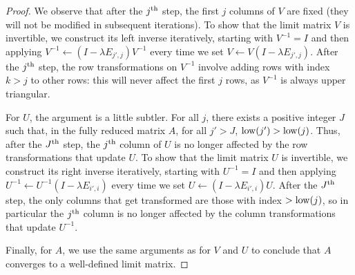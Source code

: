 \begin{proof}
  We observe that after the $j^{\text{th}}$ step, the first $j$ columns of $V$ are fixed (they will not be modified in subsequent iterations). To show that the limit matrix $V$ is invertible, we construct its left inverse iteratively, starting with $V^{-1} = I$ and then applying $V^{-1} \leftarrow (I - \lambda E_{j', j}) V^{-1}$ every time we set $V \leftarrow V (I - \lambda E_{j', j})$. After the $j^{\text{th}}$ step, the row transformations on $V^{-1}$ involve adding rows with index $k > j$ to other rows: this will never affect the first $j$ rows, as $V^{-1}$ is always upper triangular.

  For $U$, the argument is a little subtler. For all $j$, there exists a positive integer $J$ such that, in the fully reduced matrix $A$, for all $j' > J$, $\operatorname{low}(j') > \operatorname{low}(j)$. Thus, after the $J^{\text{th}}$ step, the $j^{\text{th}}$ column of $U$ is no longer affected by the row transformations that update $U$. To show that the limit matrix $U$ is invertible, we construct its right inverse iteratively, starting with $U^{-1} = I$ and then applying $U^{-1} \leftarrow U^{-1} (I - \lambda E_{i', i})$ every time we set $U \leftarrow (I - \lambda E_{i', i}) U$. After the $J^{\text{th}}$ step, the only columns that get transformed are those with index $> \operatorname{low}(j)$, so in particular the $j^{\text{th}}$ column is no longer affected by the column transformations that update $U^{-1}$.

  Finally, for $A$, we use the same arguments as for $V$ and $U$ to conclude that $A$ converges to a well-defined limit matrix.
\end{proof}

